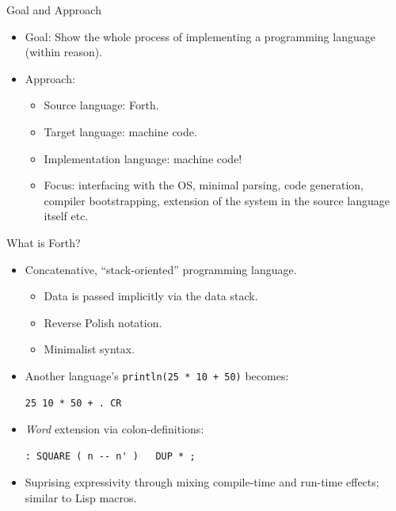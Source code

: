 \documentclass[presentation, bigger]{beamer}
\begin{document}
\begin{frame}[label={sec:orgb4b0113}]{Goal and Approach}
\begin{itemize}
\item Goal: Show the whole process of implementing a programming language
(within reason). \pause
\item Approach:
\begin{itemize}
\item Source language: \pause Forth. \pause
\item Target language: \pause machine code. \pause
\item Implementation language: \pause machine code! \pause
\item Focus: interfacing with the OS, minimal parsing, code generation,
compiler bootstrapping, extension of the system in the source
language itself etc.
\end{itemize}
\end{itemize}
\end{frame}

\begin{frame}[label={sec:org8b919bf},fragile]{What is Forth?}
 \begin{itemize}
\item Concatenative, ``stack-oriented'' programming language.
\begin{itemize}
\item Data is passed implicitly via the data stack.
\item Reverse Polish notation.
\item Minimalist syntax. \pause
\end{itemize}
\item Another language's \texttt{println(25 * 10 + 50)} becomes:
\begin{verbatim}
25 10 * 50 + . CR
\end{verbatim}
\pause
\item \emph{Word} extension via colon-definitions:
\begin{verbatim}
: SQUARE ( n -- n' )   DUP * ;
\end{verbatim}
\pause
\item Suprising expressivity through mixing compile-time and run-time
effects; similar to Lisp macros.
\end{itemize}
\end{frame}
\end{document}
